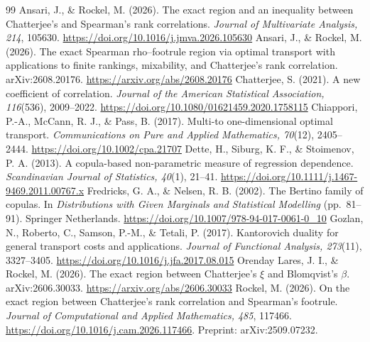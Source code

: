 \documentclass[11pt,a4paper]{article}
\theoremstyle{remark}
\newcommand{\1}{\mathbf 1}
\begin{document}
\begin{thebibliography}{99}
 Ansari, J., \& Rockel, M. (2026). The exact region and an inequality between Chatterjee's and Spearman's rank correlations. \emph{Journal of Multivariate Analysis, 214}, 105630. \url{https://doi.org/10.1016/j.jmva.2026.105630}
 Ansari, J., \& Rockel, M. (2026). The exact Spearman rho--footrule region via optimal transport with applications to finite rankings, mixability, and Chatterjee's rank correlation. arXiv:2608.20176. \url{https://arxiv.org/abs/2608.20176}
 Chatterjee, S. (2021). A new coefficient of correlation. \emph{Journal of the American Statistical Association, 116}(536), 2009--2022. \url{https://doi.org/10.1080/01621459.2020.1758115}
 Chiappori, P.-A., McCann, R. J., \& Pass, B. (2017). Multi-to one-dimensional optimal transport. \emph{Communications on Pure and Applied Mathematics, 70}(12), 2405--2444. \url{https://doi.org/10.1002/cpa.21707}
 Dette, H., Siburg, K. F., \& Stoimenov, P. A. (2013). A copula-based non-parametric measure of regression dependence. \emph{Scandinavian Journal of Statistics, 40}(1), 21--41. \url{https://doi.org/10.1111/j.1467-9469.2011.00767.x}
 Fredricks, G. A., \& Nelsen, R. B. (2002). The Bertino family of copulas. In \emph{Distributions with Given Marginals and Statistical Modelling} (pp.~81--91). Springer Netherlands. \url{https://doi.org/10.1007/978-94-017-0061-0_10}
 Gozlan, N., Roberto, C., Samson, P.-M., \& Tetali, P. (2017). Kantorovich duality for general transport costs and applications. \emph{Journal of Functional Analysis, 273}(11), 3327--3405. \url{https://doi.org/10.1016/j.jfa.2017.08.015}
 Orenday Lares, J. I., \& Rockel, M. (2026). The exact region between Chatterjee's $\xi$ and Blomqvist's $\beta$. arXiv:2606.30033. \url{https://arxiv.org/abs/2606.30033}
 Rockel, M. (2026). On the exact region between Chatterjee's rank correlation and Spearman's footrule. \emph{Journal of Computational and Applied Mathematics, 485}, 117466. \url{https://doi.org/10.1016/j.cam.2026.117466}. Preprint: arXiv:2509.07232.
\end{thebibliography}
\end{document}
